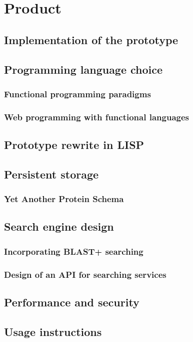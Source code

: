 \chapter{Product}

\section{Implementation of the prototype}

\section{Programming language choice}


\subsection{Functional programming paradigms}


\subsection{Web programming with functional languages}


\section{Prototype rewrite in LISP}

\section{Persistent storage}
\subsection{Yet Another Protein Schema}

\section{Search engine design}
\subsection{Incorporating BLAST+ searching}

\subsection{Design of an API for searching services}


\section{Performance and security}

\section{Usage instructions}
